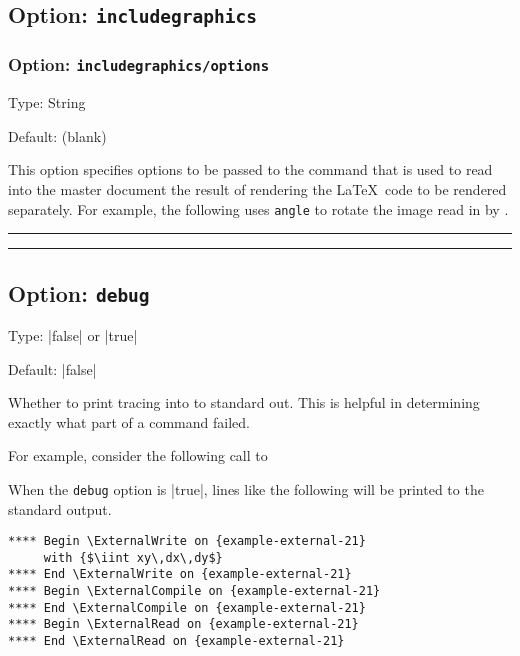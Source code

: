 \documentclass[10pt]{ltxdoc}
\newcommand{\opt}[1]{\texttt{#1}}
\def\gauge{%
  \rule{0.2em}{7pt}%
  \llap{\rule[8pt]{0.2em}{2pt}}%
}
\begin{document}
\subsection{Option: \opt{includegraphics}}
\label{subsec:includegraphics}

\subsubsection{Option: \opt{includegraphics/options}}
\label{subsubsec:includegraphics/options}

Type: String

Default: (blank)

This option specifies options to be passed to the 
command that is used to read into the master document the result of
rendering the \LaTeX\ code to be rendered separately.
For example, the following uses \opt{angle} to rotate the image read in
by .

\begin{tcblisting}{}
\gauge{}\gauge
\end{tcblisting}

\subsection{Option: \opt{debug}}
\label{subsec:debug}

Type: |false| or |true|

Default: |false|

Whether to print tracing into to standard out.
This is helpful in determining exactly what part of a command failed.

For example, consider the following call to 

\typeout{+++++++++++++++++}
\begin{tcblisting}{}
\end{tcblisting}
\typeout{+++++++++++++++++}

When the \opt{debug} option is |true|, lines like the following will be
printed to the standard output.

\begin{tcolorbox}
\begin{verbatim}
**** Begin \ExternalWrite on {example-external-21}
     with {$\iint xy\,dx\,dy$}
**** End \ExternalWrite on {example-external-21}
**** Begin \ExternalCompile on {example-external-21}
**** End \ExternalCompile on {example-external-21}
**** Begin \ExternalRead on {example-external-21}
**** End \ExternalRead on {example-external-21}
\end{verbatim}
\end{tcolorbox}
\end{document}
